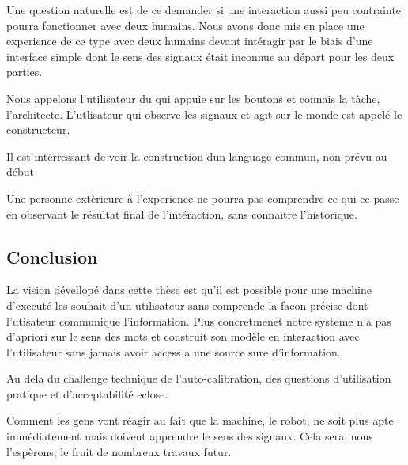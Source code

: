 Une question naturelle est de ce demander si une interaction aussi peu contrainte pourra fonctionner avec deux humains. Nous avons donc mis en place une experience de ce type avec deux humains devant intéragir par le biais d'une interface simple dont le sens des signaux était inconnue au départ pour les deux parties.

Nous appelons l'utilisateur du qui appuie sur les boutons et connais la tàche, l'architecte. L'utlisateur qui observe les signaux et agit sur le monde est appelé le constructeur.

Il est intérressant de voir la construction dun language commun, non prévu au début

Une personne extèrieure à l'experience ne pourra pas comprendre ce qui ce passe en observant le résultat final de l'intéraction, sans connaitre l'historique.

\subsection*{Conclusion}

La vision dévellopé dans cette thèse est qu'il est possible pour une machine d'executé les souhait d'un utilisateur sans comprende la facon précise dont l'utisateur communique l'information. Plus concretmenet notre systeme n'a pas d'apriori sur le sens des mots et construit son modèle en interaction avec l'utilisateur sans jamais avoir access a une source sure d'information.

Au dela du challenge technique de l'auto-calibration, des questions d'utilisation pratique et d'acceptabilité eclose.

Comment les gens vont réagir au fait que la machine, le robot, ne soit plus apte immédiatement mais doivent apprendre le sens des signaux. Cela sera, nous l'espèrons, le fruit de nombreux travaux futur.
